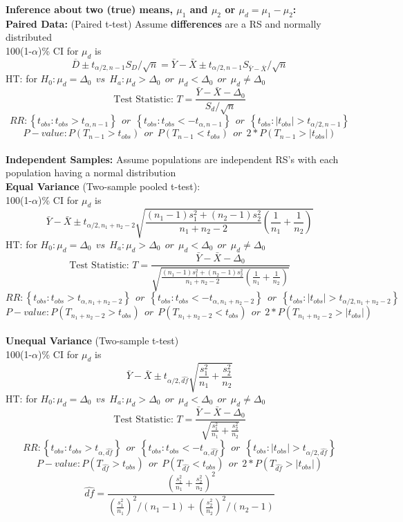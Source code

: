\noindent\Large \textbf{Inference about two (true) means, $\mu_1$ and $\mu_2$ or $\mu_d=\mu_1-\mu_2$:}\normalsize\\
\textbf{Paired Data:}  (Paired t-test) Assume \textbf{differences} are a RS and normally distributed\\
100(1-$\alpha$)\% CI for $\mu_d$ is
$$\overline{D}\pm t_{\alpha/2,n-1}S_D/\sqrt{n} = \bar{Y}-\bar{X}\pm t_{\alpha/2,n-1}S_{\bar{Y}-\bar{X}}/\sqrt{n}$$
HT: for $H_0:\mu_d=\Delta_0~~vs~~H_a: \mu_d>\Delta_0~~or~~\mu_d<\Delta_0~~or~~\mu_d\neq\Delta_0$
$$\mbox{Test Statistic: } T=\frac{\bar{Y}-\bar{X}-\Delta_0}{S_d/\sqrt{n}}$$
$$RR: \left\{t_{obs}:t_{obs}>t_{\alpha,n-1}\right\}~~or~~\left\{t_{obs}:t_{obs}<-t_{\alpha,n-1}\right\}~~or~~\left\{t_{obs}:|t_{obs}|>t_{\alpha/2,n-1}\right\}$$
$$P-value: P(T_{n-1}>t_{obs})~~or~~P(T_{n-1}<t_{obs})~~or~~2*P(T_{n-1}>|t_{obs}|)$$
~\\
\textbf{Independent Samples:} Assume populations are independent RS's with each population having a normal distribution\\
\textbf{Equal Variance} (Two-sample pooled t-test):\\
100(1-$\alpha$)\% CI for $\mu_d$ is
$$\bar{Y}-\bar{X}\pm t_{\alpha/2,n_1+n_2-2}\sqrt{\frac{(n_1-1)s_1^2+(n_2-1)s_2^2}{n_1+n_2-2}\left(\frac{1}{n_1}+\frac{1}{n_2}\right)}$$
HT: for $H_0:\mu_d=\Delta_0~~vs~~H_a: \mu_d>\Delta_0~~or~~\mu_d<\Delta_0~~or~~\mu_d\neq\Delta_0$
$$\mbox{Test Statistic: } T=\frac{\bar{Y}-\bar{X}-\Delta_0}{\sqrt{\frac{(n_1-1)s_1^2+(n_2-1)s_2^2}{n_1+n_2-2}\left(\frac{1}{n_1}+\frac{1}{n_2}\right)}}$$
$$RR: \left\{t_{obs}:t_{obs}>t_{\alpha,n_1+n_2-2}\right\}~~or~~\left\{t_{obs}:t_{obs}<-t_{\alpha,n_1+n_2-2}\right\}~~or~~\left\{t_{obs}:|t_{obs}|>t_{\alpha/2,n_1+n_2-2}\right\}$$
$$P-value: P(T_{n_1+n_2-2}>t_{obs})~~or~~P(T_{n_1+n_2-2}<t_{obs})~~or~~2*P(T_{n_1+n_2-2}>|t_{obs}|)$$
~\\
\textbf{Unequal Variance} (Two-sample t-test)\\
100(1-$\alpha$)\% CI for $\mu_d$ is
$$\bar{Y}-\bar{X}\pm t_{\alpha/2,\widehat{df}}\sqrt{\frac{s_1^2}{n_1}+\frac{s_2^2}{n_2}}$$
HT: for $H_0:\mu_d=\Delta_0~~vs~~H_a: \mu_d>\Delta_0~~or~~\mu_d<\Delta_0~~or~~\mu_d\neq\Delta_0$
$$\mbox{Test Statistic: } T=\frac{\bar{Y}-\bar{X}-\Delta_0}{\sqrt{\frac{s_1^2}{n_1}+\frac{s_2^2}{n_2}}}$$
$$RR: \left\{t_{obs}:t_{obs}>t_{\alpha,\widehat{df}}\right\}~~or~~\left\{t_{obs}:t_{obs}<-t_{\alpha,\widehat{df}}\right\}~~or~~\left\{t_{obs}:|t_{obs}|>t_{\alpha/2,\widehat{df}}\right\}$$
$$P-value: P(T_{\widehat{df}}>t_{obs})~~or~~P(T_{\widehat{df}}<t_{obs})~~or~~2*P(T_{\widehat{df}}>|t_{obs}|)$$
$$\widehat{df}=\frac{\left(\frac{s_1^2}{n_1}+\frac{s_2^2}{n_2}\right)^2}{\left(\frac{s_1^2}{n_1}\right)^2/(n_1-1)+\left(\frac{s_2^2}{n_2}\right)^2/(n_2-1)}$$

